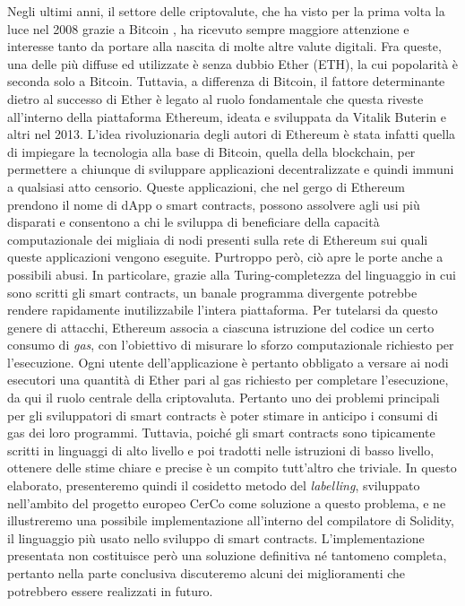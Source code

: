 \documentclass[12pt,a4paper,openright,oneside]{report}
\theoremstyle{definition}
\begin{document}
Negli ultimi anni, il settore delle criptovalute, che ha visto per la prima volta la luce nel 2008 grazie a Bitcoin \cite{bitcoin}, ha ricevuto sempre maggiore attenzione e interesse tanto da portare alla nascita di molte altre valute digitali. Fra queste, una delle pi\`{u} diffuse ed utilizzate \`{e} senza dubbio Ether (ETH), la cui popolarit\`{a} \`{e} seconda solo a Bitcoin. Tuttavia, a differenza di Bitcoin, il fattore determinante dietro al successo di Ether \`{e} legato al ruolo fondamentale che questa riveste all'interno della piattaforma Ethereum, ideata e sviluppata da Vitalik Buterin e altri nel 2013. L'idea rivoluzionaria degli autori di Ethereum \`{e} stata infatti quella di impiegare la tecnologia alla base di Bitcoin, quella della blockchain, per permettere a chiunque di sviluppare applicazioni decentralizzate e quindi immuni a qualsiasi atto censorio. Queste applicazioni, che nel gergo di Ethereum prendono il nome di dApp o smart contracts, possono assolvere agli usi pi\`{u} disparati e consentono a chi le sviluppa di beneficiare della capacit\`{a} computazionale dei migliaia di nodi presenti sulla rete di Ethereum sui quali queste applicazioni vengono eseguite. Purtroppo per\`{o}, ci\`{o} apre le porte anche a possibili abusi. In particolare, grazie alla Turing-completezza del linguaggio in cui sono scritti gli smart contracts, un banale programma divergente potrebbe rendere rapidamente inutilizzabile l'intera piattaforma. Per tutelarsi da questo genere di attacchi, Ethereum associa a ciascuna istruzione del codice un certo consumo di \textit{gas}, con l'obiettivo di misurare lo sforzo computazionale richiesto per l'esecuzione. Ogni utente dell'applicazione \`{e} pertanto obbligato a versare ai nodi esecutori una quantit\`{a} di Ether pari al gas richiesto per completare l'esecuzione, da qui il ruolo centrale della criptovaluta. Pertanto uno dei problemi principali per gli sviluppatori di smart contracts \`{e} poter stimare in anticipo i consumi di gas dei loro programmi. Tuttavia, poich\'{e} gli smart contracts sono tipicamente scritti in linguaggi di alto livello e poi tradotti nelle istruzioni di basso livello, ottenere delle stime chiare e precise \`{e} un compito tutt'altro che triviale. In questo elaborato, presenteremo quindi il cosidetto metodo del \textit{labelling}, sviluppato nell'ambito del progetto europeo CerCo come soluzione a questo problema, e ne illustreremo una possibile implementazione all'interno del compilatore di Solidity, il linguaggio pi\`{u} usato nello sviluppo di smart contracts. L'implementazione presentata non costituisce per\`{o} una soluzione definitiva n\'{e} tantomeno completa, pertanto nella parte conclusiva discuteremo alcuni dei miglioramenti che potrebbero essere realizzati in futuro.
\end{document}
